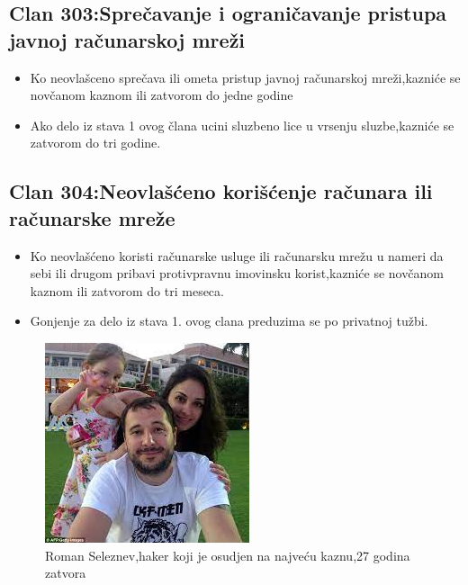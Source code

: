 \documentclass[a4paper]{article}
\begin{document}
\subsection{Clan 303:Sprečavanje i ograničavanje pristupa javnoj računarskoj mreži}
\begin{itemize}
	\item Ko neovlašceno sprečava ili ometa pristup javnoj računarskoj mreži,kazniće se novčanom kaznom ili zatvorom do jedne godine
	\item Ako delo iz stava 1 ovog člana ucini sluzbeno lice u vrsenju sluzbe,kazniće se zatvorom do tri godine.
\end{itemize}
\subsection{Clan 304:Neovlašćeno korišćenje računara ili računarske mreže}
\begin{itemize}
	\item Ko neovlašćeno koristi računarske usluge ili računarsku mrežu u nameri da sebi ili drugom pribavi protivpravnu imovinsku korist,kazniće se novčanom kaznom ili zatvorom do tri meseca.
	\item Gonjenje za delo iz stava 1. ovog clana preduzima se po privatnoj tužbi.
\end{itemize}
\begin{figure}[h!]
	\begin{center}
		\includegraphics[scale=0.30]{roman.jpeg}
	\end{center}
	\caption{Roman Seleznev,haker koji je osudjen na najveću kaznu,27 godina zatvora}
	\label{fig:roman}
\end{figure}
\newpage









 
\end{document}
